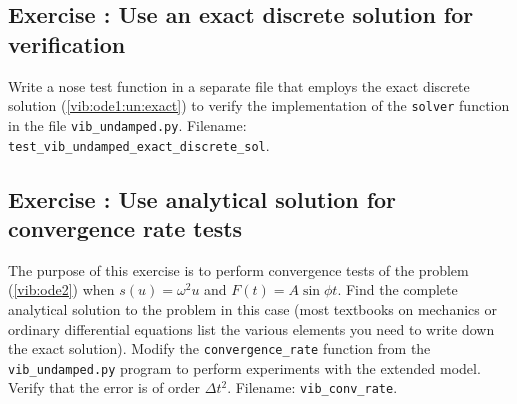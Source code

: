 \documentclass[%
oneside,                 %
final,                   %
10pt]{article}
\newenvironment{doconceexercise}{}{}
\newcounter{doconceexercisecounter}
\begin{document}
\begin{doconceexercise}

\subsection*{Exercise \thedoconceexercisecounter: Use an exact discrete solution for verification}

\label{vib:exer:discrete:omega}

Write a nose test function in a separate file
that employs the exact discrete solution
(\ref{vib:ode1:un:exact}) to verify the implementation of the
\texttt{solver} function in the file \Verb!vib_undamped.py!.
\noindent Filename: \Verb!test_vib_undamped_exact_discrete_sol!.

\end{doconceexercise}




\begin{doconceexercise}

\subsection*{Exercise \thedoconceexercisecounter: Use analytical solution for convergence rate tests}

\label{vib:exer:conv:rate}

The purpose of this exercise is to perform convergence tests of the
problem (\ref{vib:ode2}) when $s(u)=\omega^2u$ and $F(t)=A\sin\phi t$.
Find the complete analytical solution to the problem in this case
(most textbooks on mechanics or ordinary differential equations list
the various elements you need to write down the exact solution).
Modify the \Verb!convergence_rate! function from the \Verb!vib_undamped.py!
program to perform experiments with the extended model.  Verify that
the error is of order $\Delta t^2$.
\noindent Filename: \Verb!vib_conv_rate!.

\end{doconceexercise}
\end{document}
